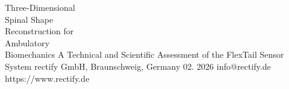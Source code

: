 \documentclass[11pt, a4paper]{article}
\begin{document}


\rectifytitlepage
{Three-Dimensional\\[6pt]Spinal Shape\\[6pt]Reconstruction for\\[6pt]Ambulatory\\[6pt]Biomechanics}
{A Technical and Scientific Assessment of the FlexTail Sensor System}
{rectify GmbH, Braunschweig, Germany}
{\paperversion}
{02. 2026}
{info@rectify.de}
{https://www.rectify.de}


{\setlength{\parskip}{1pt}\tableofcontents}
\newpage




\newpage


\newpage


\newpage


\newpage


\newpage


\newpage


\newpage


\newpage




\end{document}
